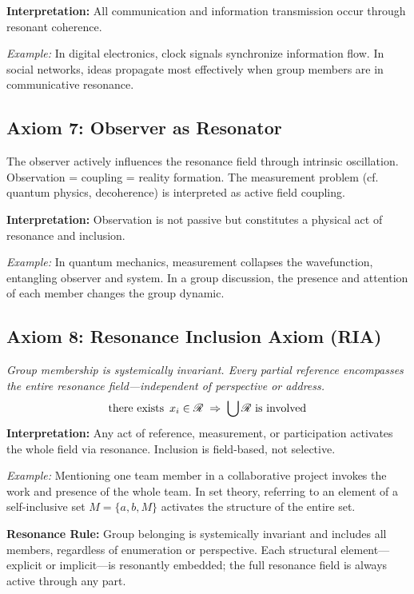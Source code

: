 \documentclass[12pt]{iopart}
\providecommand{\mathcal}[1]{\mathscr{#1}}
\providecommand{\text}[1]{\mbox{#1}}
\providecommand{\exists}{\hbox{there exists }}
\begin{document}
\textbf{Interpretation:} All communication and information transmission occur through resonant coherence.

\textit{Example:} In digital electronics, clock signals synchronize information flow. In social networks, ideas propagate most effectively when group members are in communicative resonance.

\subsection{Axiom 7: Observer as Resonator}
The observer actively influences the resonance field through intrinsic oscillation. Observation = coupling = reality formation. The measurement problem (cf. quantum physics, decoherence) is interpreted as active field coupling.

\textbf{Interpretation:} Observation is not passive but constitutes a physical act of resonance and inclusion.

\textit{Example:} In quantum mechanics, measurement collapses the wavefunction, entangling observer and system. In a group discussion, the presence and attention of each member changes the group dynamic.

\subsection{Axiom 8: Resonance Inclusion Axiom (RIA)}
\textit{Group membership is systemically invariant. Every partial reference encompasses the entire resonance field—independent of perspective or address.}
\[
\exists\, x_i \in \mathcal{R} \;\Rightarrow\; \bigcup \mathcal{R} \text{ is involved}
\]
\textbf{Interpretation:} Any act of reference, measurement, or participation activates the whole field via resonance. Inclusion is field-based, not selective.

\textit{Example:} Mentioning one team member in a collaborative project invokes the work and presence of the whole team. In set theory, referring to an element of a self-inclusive set $M = \{a, b, M\}$ activates the structure of the entire set.

\medskip

\textbf{Resonance Rule:}  
Group belonging is systemically invariant and includes all members, regardless of enumeration or perspective. Each structural element—explicit or implicit—is resonantly embedded; the full resonance field is always active through any part.

\medskip
\end{document}
